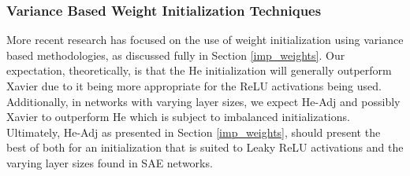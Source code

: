 \documentclass[a4paper,11pt,oneside]{article}
\theoremstyle{plain}
\theoremstyle{definition}
\begin{document}
	\subsubsection{Variance Based Weight Initialization Techniques}
	
	More recent research has focused on the use of weight initialization using variance based methodologies, as discussed fully in Section \ref{imp_weights}. Our expectation, theoretically, is that the He initialization will generally outperform Xavier due to it being more appropriate for the ReLU activations being used. Additionally, in networks with varying layer sizes, we expect He-Adj and possibly Xavier to outperform He which is subject to imbalanced initializations. Ultimately, He-Adj as presented in Section \ref{imp_weights}, should present the best of both for an initialization that is suited to Leaky ReLU activations and the varying layer sizes found in SAE networks.\newline
	
\end{document}
